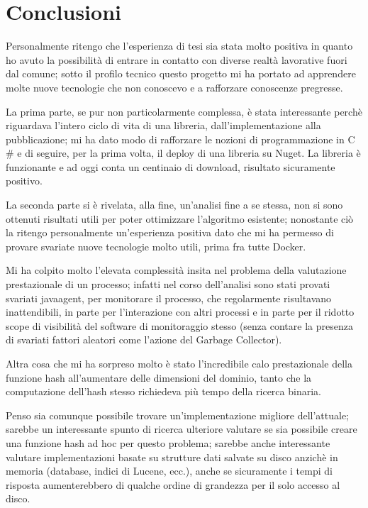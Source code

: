 \chapter{Conclusioni}
Personalmente ritengo che l'esperienza di tesi sia stata molto positiva in quanto ho avuto la possibilità di entrare in contatto con diverse realtà lavorative fuori dal comune; 
sotto il profilo tecnico questo progetto mi ha portato ad apprendere molte nuove tecnologie che non conoscevo e a rafforzare conoscenze pregresse.

La prima parte, se pur non particolarmente complessa, è stata interessante perchè riguardava l'intero ciclo di vita di una libreria, dall'implementazione alla pubblicazione;
mi ha dato modo di rafforzare le nozioni di programmazione in C$\#$ e di seguire, per la prima volta, il deploy di una libreria su Nuget. 
La libreria è funzionante e ad oggi conta un centinaio di download, risultato sicuramente positivo.

La seconda parte si è rivelata, alla fine, un'analisi fine a se stessa, non si sono ottenuti risultati utili per poter ottimizzare l'algoritmo esistente;
nonostante ciò la ritengo personalmente un'esperienza positiva dato che mi ha permesso di provare svariate nuove tecnologie molto utili, prima fra tutte Docker. 

Mi ha colpito molto l'elevata complessità insita nel problema della valutazione prestazionale di un processo; 
infatti nel corso dell'analisi sono stati provati svariati javaagent, per monitorare il processo, che regolarmente risultavano inattendibili, 
in parte per l'interazione con altri processi e in parte per il ridotto scope di visibilità del software di monitoraggio stesso 
(senza contare la presenza di svariati fattori aleatori come l'azione del Garbage Collector).

Altra cosa che mi ha sorpreso molto è stato l'incredibile calo prestazionale della funzione hash all'aumentare delle dimensioni del dominio, tanto che la computazione dell'hash stesso 
richiedeva più tempo della ricerca binaria.

Penso sia comunque possibile trovare un'implementazione migliore dell'attuale; sarebbe un interessante spunto di ricerca ulteriore valutare se sia possibile creare una 
funzione hash ad hoc per questo problema; sarebbe anche interessante valutare implementazioni basate su strutture dati salvate su disco anzichè in memoria 
(database, indici di Lucene\cite{lucene}, ecc.), anche se sicuramente i tempi di risposta aumenterebbero di qualche ordine di grandezza per il solo accesso al disco. 

